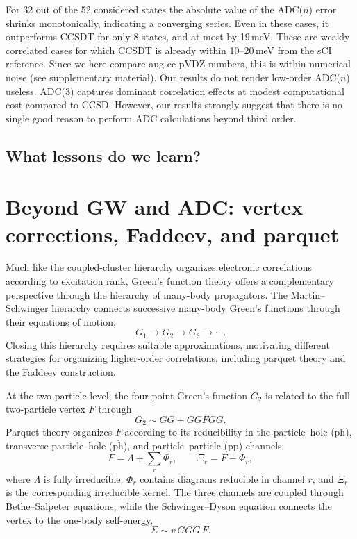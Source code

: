 \documentclass[aip,jcp,reprint,noshowkeys,superscriptaddress]{revtex4-2}
\newcommand{\ph}{\text{ph}}
\newcommand{\pp}{\text{pp}}
\begin{document}
For 32 out of the 52 considered states the absolute value of the ADC($n$) error shrinks monotonically, indicating a converging series. Even in these cases, it outperforms CCSDT for only 8 states, and at most by 19\,meV. These are weakly correlated cases for which CCSDT is already within 10--20\,meV from the sCI reference.
Since we here compare aug-cc-pVDZ numbers, this is within numerical noise (see supplementary material). Our results do not render low-order ADC($n$) useless. ADC(3) captures dominant correlation effects at modest computational cost compared to CCSD. However, our results strongly suggest that there is no single good reason to perform ADC calculations beyond third order.    

\subsection{What lessons do we learn?}


\section{\label{sec:beyond}Beyond GW and ADC: vertex corrections, Faddeev, and parquet}



Much like the coupled-cluster hierarchy organizes electronic
correlations according to excitation rank, Green's function theory
offers a complementary perspective through the hierarchy of many-body
propagators. The Martin--Schwinger hierarchy connects successive many-body
Green's functions through their equations of motion,
\begin{equation}
  G_1 \longrightarrow G_2 \longrightarrow G_3
  \longrightarrow \cdots.
\end{equation}
Closing this hierarchy requires suitable approximations, motivating 
different strategies for organizing higher-order correlations, 
including parquet theory and the Faddeev construction.

At the two-particle level, the four-point Green's function $G_2$
is related to the full two-particle vertex $F$ through
\begin{equation}
  G_2 \sim GG + GGFGG.
\end{equation}
Parquet theory organizes $F$ according to its reducibility
in the particle--hole ($\ph$), transverse particle--hole
($\overline{\ph}$), and particle--particle ($\pp$) channels:
\begin{equation}
  F = \Lambda + \sum_r \Phi_r,
  \qquad
  \Xi_r = F - \Phi_r,
\end{equation}
where $\Lambda$ is fully irreducible, $\Phi_r$ contains diagrams
reducible in channel $r$, and $\Xi_r$ is the corresponding irreducible
kernel. The three channels are coupled through Bethe--Salpeter
equations, while the Schwinger--Dyson equation connects the vertex
to the one-body self-energy,
\begin{equation}
  \Sigma \sim v\,GGG\,F.
\end{equation}
\end{document}

